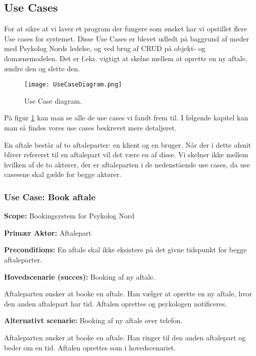 \subsection{Use Cases}
For at sikre at vi laver et program der fungere som ønsket har vi opstillet flere Use cases for systemet.
Disse Use Cases er blevet udledt på baggrund af møder med Psykolog Nords ledelse, og ved brug af CRUD på objekt- og domænemodelen. Det er f.eks. vigtigt at skelne mellem at oprette en ny aftale, ændre den og slette den. 

\begin{figure}[p]
	\centering
  		\texttt{[image: UseCaseDiagram.png]}
  \caption{Use Case diagram.}
  \label{fig:UseCaseDiagram}
\end{figure}

På figur \ref{fig:UseCaseDiagram} kan man se alle de use cases vi fandt frem til. 
I følgende kapitel kan man så findes vores use cases beskrevet mere detaljeret.

En aftale består af to aftaleparter: en klient og en bruger. 
Når der i dette afsnit bliver refereret til en aftalepart vil det være en af disse. 
Vi skelner ikke mellem hvilken af de to aktører, der er aftaleparten i de nedenstående use cases, da use casesene skal gælde for begge aktører.

\subsubsection{Use Case: Book aftale}\label{usecase:bookaftale}
{\setlength{\parindent}{0cm}
\textbf{Scope:} Bookingsystem for Psykolog Nord

\textbf{Primær Aktør:} Aftalepart

\textbf{Preconditions:} En aftale skal ikke eksistere på det givne tidspunkt for begge aftaleparter.

\textbf{Hovedscenarie (succes):} Booking af ny aftale.

Aftaleparten ønsker at booke en aftale. 
Han vælger at oprette en ny aftale, hvor den anden aftalepart har tid. 
Aftalen oprettes og psykologen notificeres.

\textbf{Alternativt scenarie:} Booking af ny aftale over telefon.

Aftaleparten ønsker at booke en aftale. Han ringer til den anden aftalepart og beder om en tid. Aftalen oprettes som i hovedscenariet.
}

